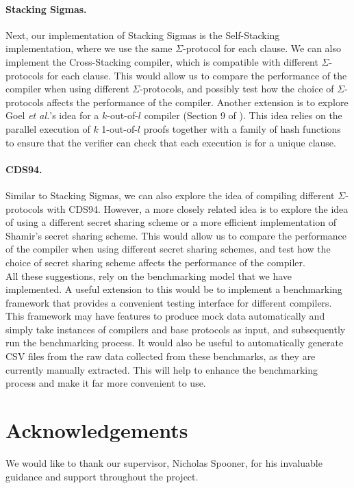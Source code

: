 \paragraph{Stacking Sigmas.} Next, our implementation of Stacking Sigmas is the Self-Stacking 
implementation, where we use the same $\Sigma$-protocol for each clause. We can also implement
the Cross-Stacking compiler, which is compatible with different $\Sigma$-protocols for each clause.
This would allow us to compare the performance of the compiler when using different $\Sigma$-protocols, 
and possibly test how the choice of $\Sigma$-protocols affects the performance of the compiler. Another 
extension is to explore Goel {\em et al.}'s idea for a $k$-out-of-$l$ compiler (Section 9 of \cite{StackingSigmas}).
This idea relies on the parallel execution of $k$ 1-out-of-$l$ proofs together with a family of hash functions to 
ensure that the verifier can check that each execution is for a unique clause. 

\paragraph{CDS94.} Similar to Stacking Sigmas, we can also explore the idea of compiling different $\Sigma$-protocols
with CDS94. However, a more closely related idea is to explore the idea of using a different secret sharing scheme or 
a more efficient implementation of Shamir's secret sharing scheme. This would allow us to compare the performance of
the compiler when using different secret sharing schemes, and test how the choice of secret sharing scheme
affects the performance of the compiler. \\

All these suggestions, rely on the benchmarking model that we have implemented. A useful extension to this would be to 
implement a benchmarking framework that provides a convenient testing interface for different compilers. This framework 
may have features to produce mock data automatically and simply take instances of compilers and base protocols as input, 
and subsequently run the benchmarking process. It would also be useful to automatically generate CSV files from 
the raw data collected from these benchmarks, as they are currently manually extracted. This will help to enhance 
the benchmarking process and make it far more convenient to use. 

\section*{Acknowledgements}
\label{sec:acknowledgements}
We would like to thank our supervisor, Nicholas Spooner, for his invaluable guidance and support throughout the project.
